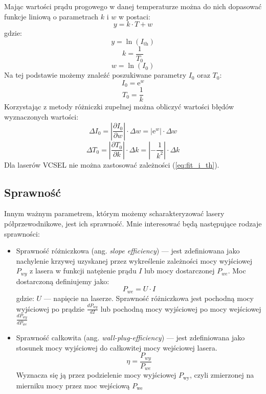 Mając wartości prądu progowego w danej temperaturze można do nich dopasować funkcje liniową o parametrach $k$ i $w$ w postaci:
\begin{equation}
y = k \cdot T + w
\end{equation}
gdzie:
\begin{equation}
y = \ln(I_{\mathrm{th}})
\end{equation}
\begin{equation}
k = \frac{1}{T_0}
\end{equation}
\begin{equation}
w = \ln(I_0)
\end{equation}
Na tej podstawie możemy znaleźć poszukiwane parametry $I_0$ oraz $T_0$:
\begin{equation}
I_0 = \mathrm{e}^w
\end{equation}
\begin{equation}
T_0 = \frac{1}{k}
\end{equation}
Korzystając z metody różniczki zupełnej można obliczyć wartości błędów wyznaczonych wartości:
\begin{equation}
\Delta I_0 = \left\lvert \frac{\partial I_{0}}{\partial w} \right\rvert \cdot \Delta w = | \mathrm{e}^w | \cdot \Delta w
\end{equation}
\begin{equation}
\Delta T_0 = \left\lvert \frac{\partial T_{0}}{\partial k} \right\rvert \cdot \Delta k = \left\lvert -\frac{1}{k^2} \right\rvert \cdot \Delta k
\end{equation}
Dla laserów VCSEL nie można zastosować zależności (\ref{eq:fit_i_th}).
\subsection{Sprawność}
Innym ważnym parametrem, którym możemy scharakteryzować lasery półprzewodnikowe, jest ich sprawność. Mnie interesować będą
następujące rodzaje sprawności:
\begin{itemize}
\item Sprawność różniczkowa (ang. \textit{slope efficiency}) --- jest zdefiniowana jako nachylenie krzywej uzyskanej przez wykreślenie zależności
mocy wyjściowej $P_{wy}$ z lasera w funkcji natężenie prądu $I$ lub mocy dostarczonej $P_{we}$.
Moc dostarczoną definiujemy jako:
\begin{equation}
P_{we} = U \cdot I
\end{equation}
gdzie: $U$ --- napięcie na laserze.
Sprawność różniczkowa jest pochodną mocy wyjściowej po prądzie $\frac{dP_{wy}}{dI}$ lub pochodną mocy wyjściowej po mocy wejściowej $\frac{dP_{wy}}{dP_{we}}$
\item Sprawność całkowita (ang. \textit{wall-plug-efficiency}) --- jest zdefiniowana jako stosunek mocy wyjściowej do całkowitej mocy wejściowej lasera.
\begin{equation}
\eta = \frac{P_{wy}}{P_{we}}
\end{equation}
Wyznacza się ją przez podzielenie mocy wyjściowej $P_{\mathrm{wy}}$, czyli zmierzonej na mierniku mocy przez moc wejściową $P_{\mathrm{we}}$
\end{itemize}